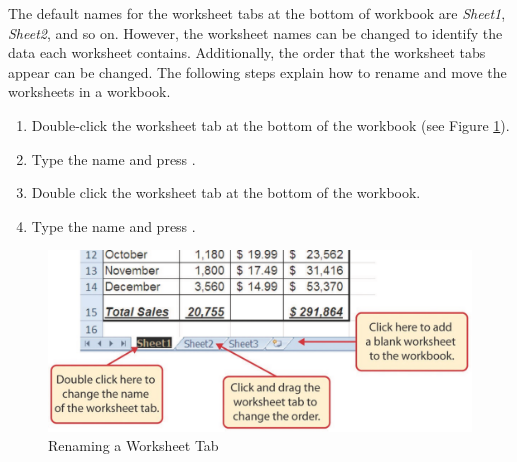 The default names for the worksheet tabs at the bottom of workbook are \textit{Sheet1}, \textit{Sheet2}, and so on. However, the worksheet names can be changed to identify the data each worksheet contains. Additionally, the order that the worksheet tabs appear can be changed. The following steps explain how to rename and move the worksheets in a workbook.

\begin{enumbox}
	\begin{enumerate}
		\item Double-click the  worksheet tab at the bottom of the workbook (see Figure \ref{01:fig47}). 
		\item Type the name  and press .
		\item Double click the  worksheet tab at the bottom of the workbook.
		\item Type the name  and press .
	\end{enumerate}
\end{enumbox}

\begin{figure}[H]
	\centering
	\includegraphics[width=\maxwidth{.95\linewidth}]{gfx/ch01_fig47}
	\caption{Renaming a Worksheet Tab}
	\label{01:fig47}
\end{figure}

